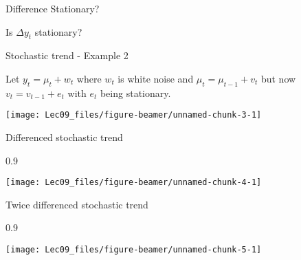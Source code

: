 \documentclass[11pt,ignorenonframetext,]{beamer}
\newenvironment{Shaded}{}{}
\newcommand{\DataTypeTok}[1]{\textcolor[rgb]{0.56,0.13,0.00}{#1}}
\newcommand{\DecValTok}[1]{\textcolor[rgb]{0.25,0.63,0.44}{#1}}
\newcommand{\KeywordTok}[1]{\textcolor[rgb]{0.00,0.44,0.13}{\textbf{#1}}}
\newcommand{\NormalTok}[1]{#1}
\newcommand{\OperatorTok}[1]{\textcolor[rgb]{0.40,0.40,0.40}{#1}}
\let\oldShaded\Shaded
\let\endoldShaded\endShaded
\renewenvironment{Shaded}{\footnotesize\begin{spacing}{0.9}\oldShaded}{\endoldShaded\end{spacing}}
\begin{document}
\begin{frame}[t]{Difference Stationary?}
\protect\hypertarget{difference-stationary}{}

Is \(\Delta y_t\) stationary?

\end{frame}

\begin{frame}[t]{Stochastic trend - Example 2}
\protect\hypertarget{stochastic-trend---example-2}{}

Let \(y_t = \mu_t + w_t\) where \(w_t\) is white noise and
\(\mu_t = \mu_{t-1} + v_t\) but now \(v_t = v_{t-1} + e_t\) with \(e_t\)
being stationary.

\begin{center}\texttt{[image: Lec09\_files/figure-beamer/unnamed-chunk-3-1]} \end{center}

\end{frame}

\begin{frame}[fragile]{Differenced stochastic trend}
\protect\hypertarget{differenced-stochastic-trend-1}{}

\begin{Shaded}
\end{Shaded}

\begin{center}\texttt{[image: Lec09\_files/figure-beamer/unnamed-chunk-4-1]} \end{center}

\end{frame}

\begin{frame}[fragile]{Twice differenced stochastic trend}
\protect\hypertarget{twice-differenced-stochastic-trend}{}

\begin{Shaded}
\end{Shaded}

\begin{center}\texttt{[image: Lec09\_files/figure-beamer/unnamed-chunk-5-1]} \end{center}

\end{frame}
\end{document}
